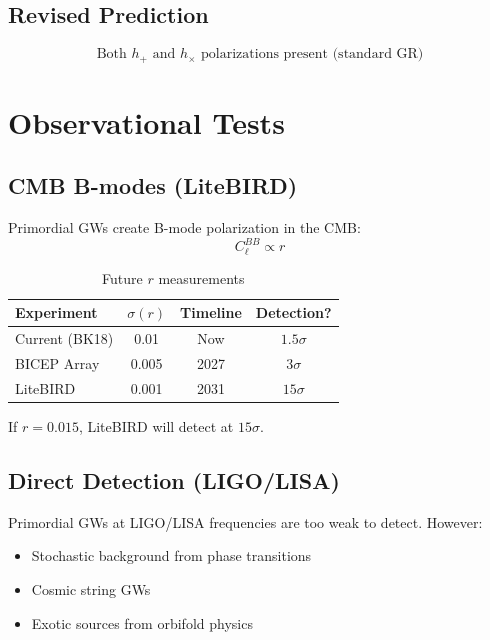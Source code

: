 \documentclass[12pt,a4paper]{article}
\begin{document}
\subsection{Revised Prediction}

\begin{equation}
\boxed{\text{Both } h_+ \text{ and } h_\times \text{ polarizations present (standard GR)}}
\end{equation}

\section{Observational Tests}

\subsection{CMB B-modes (LiteBIRD)}

Primordial GWs create B-mode polarization in the CMB:
\begin{equation}
C_\ell^{BB} \propto r
\end{equation}

\begin{table}[h]
\centering
\begin{tabular}{lccc}
\toprule
Experiment & $\sigma(r)$ & Timeline & Detection? \\
\midrule
Current (BK18) & 0.01 & Now & $1.5\sigma$ \\
BICEP Array & 0.005 & 2027 & $3\sigma$ \\
LiteBIRD & 0.001 & 2031 & $15\sigma$ \\
\bottomrule
\end{tabular}
\caption{Future $r$ measurements}
\end{table}

If $r = 0.015$, LiteBIRD will detect at $15\sigma$.

\subsection{Direct Detection (LIGO/LISA)}

Primordial GWs at LIGO/LISA frequencies are too weak to detect. However:
\begin{itemize}
    \item Stochastic background from phase transitions
    \item Cosmic string GWs
    \item Exotic sources from orbifold physics
\end{itemize}
\end{document}
